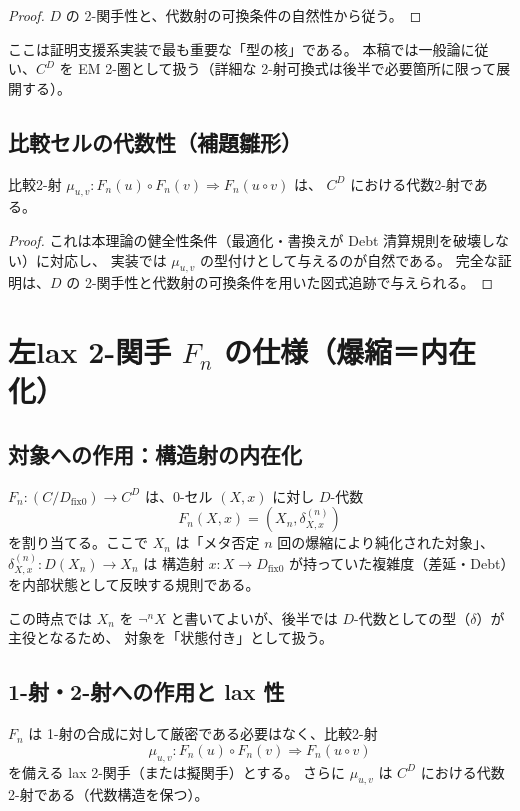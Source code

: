 \documentclass[a4paper,11pt]{article}
\begin{document}
\begin{proof}
$D$ の 2-関手性と、代数射の可換条件の自然性から従う。
\end{proof}

\begin{remark}
ここは証明支援系実装で最も重要な「型の核」である。
本稿では一般論に従い、$C^D$ を EM 2-圏として扱う（詳細な 2-射可換式は後半で必要箇所に限って展開する）。
\end{remark}

\subsection{比較セルの代数性（補題雛形）}
\begin{lemma}[$\mu_{u,v}$ の代数2-射性（雛形）]
比較2-射 $\mu_{u,v}:F_n(u)\circ F_n(v)\Rightarrow F_n(u\circ v)$ は、
$C^D$ における代数2-射である。
\end{lemma}

\begin{proof}
これは本理論の健全性条件（最適化・書換えが Debt 清算規則を破壊しない）に対応し、
実装では $\mu_{u,v}$ の型付けとして与えるのが自然である。
完全な証明は、$D$ の 2-関手性と代数射の可換条件を用いた図式追跡で与えられる。
\end{proof}

\section{左lax 2-関手 \texorpdfstring{$F_n$}{Fn} の仕様（爆縮＝内在化）}
\subsection{対象への作用：構造射の内在化}
\begin{definition}[$F_n$ の対象作用（仕様）]
$F_n:(C/D_{\mathrm{fix}0})\to C^D$ は、0-セル $(X,x)$ に対し $D$-代数
\[
  F_n(X,x) = (X_n,\delta_{X,x}^{(n)})
\]
を割り当てる。ここで $X_n$ は「メタ否定 $n$ 回の爆縮により純化された対象」、$\delta_{X,x}^{(n)}:D(X_n)\to X_n$ は
構造射 $x:X\to D_{\mathrm{fix}0}$ が持っていた複雑度（差延・Debt）を内部状態として反映する規則である。
\end{definition}

\begin{remark}
この時点では $X_n$ を $\neg^n X$ と書いてよいが、後半では $D$-代数としての型（$\delta$）が主役となるため、
対象を「状態付き」として扱う。
\end{remark}

\subsection{1-射・2-射への作用と lax 性}
\begin{definition}
$F_n$ は 1-射の合成に対して厳密である必要はなく、比較2-射
\[
  \mu_{u,v}: F_n(u)\circ F_n(v)\Rightarrow F_n(u\circ v)
\]
を備える lax 2-関手（または擬関手）とする。
さらに $\mu_{u,v}$ は $C^D$ における代数2-射である（代数構造を保つ）。
\end{definition}
\end{document}
